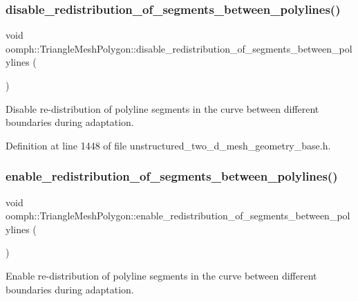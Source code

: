 \subsubsection{\texorpdfstring{disable\+\_\+redistribution\+\_\+of\+\_\+segments\+\_\+between\+\_\+polylines()}{disable\_redistribution\_of\_segments\_between\_polylines()}}
{\footnotesize\ttfamily void oomph\+::\+Triangle\+Mesh\+Polygon\+::disable\+\_\+redistribution\+\_\+of\+\_\+segments\+\_\+between\+\_\+polylines (\begin{DoxyParamCaption}{ }\end{DoxyParamCaption})\hspace{0.3cm}{\ttfamily [inline]}}



Disable re-\/distribution of polyline segments in the curve between different boundaries during adaptation. 



Definition at line 1448 of file unstructured\+\_\+two\+\_\+d\+\_\+mesh\+\_\+geometry\+\_\+base.\+h.

\mbox{\label{classoomph_1_1TriangleMeshPolygon_af3988a8dfd66d748819bacdff868715d}} 
\subsubsection{\texorpdfstring{enable\+\_\+redistribution\+\_\+of\+\_\+segments\+\_\+between\+\_\+polylines()}{enable\_redistribution\_of\_segments\_between\_polylines()}}
{\footnotesize\ttfamily void oomph\+::\+Triangle\+Mesh\+Polygon\+::enable\+\_\+redistribution\+\_\+of\+\_\+segments\+\_\+between\+\_\+polylines (\begin{DoxyParamCaption}{ }\end{DoxyParamCaption})\hspace{0.3cm}{\ttfamily [inline]}}



Enable re-\/distribution of polyline segments in the curve between different boundaries during adaptation. 



